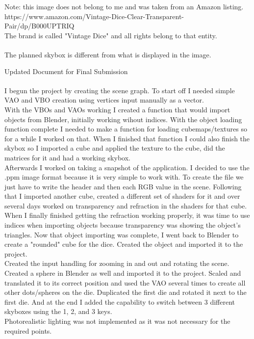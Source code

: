 \documentclass{article}
\begin{document}
Note: this image does not belong to me and was taken from an Amazon listing. \\
https://www.amazon.com/Vintage-Dice-Clear-Transparent-Pair/dp/B000UPTRIQ \\
The brand is called "Vintage Dice" and all rights belong to that entity. \\\\

The planned skybox is different from what is displayed in the image.

\newpage{}
Updated Document for Final Submission\\\\
I begun the project by creating the scene graph. To start off I needed simple VAO
and VBO creation using vertices input manually as a vector. 
\\With the VBOs and VAOs
working I created a function that would import objects from Blender, initially working 
wihout indices. With the object loading function complete I needed to make a function
for loading cubemaps/textures so for a while I worked on that.
When I finished that function I could also finish the skybox so I imported a cube and
applied the texture to the cube, did the matrices for it and had a working skybox.
\\Afterwards I worked on taking a snapshot of the application. I decided to use the
.ppm image format because it is very simple to work with. To create the file we just have
to write the header and then each RGB value in the scene. Following that I imported another cube, created a different set of shaders for it
and over several days worked on transparency and refraction in the shaders for that 
cube.
\\When I finally finished getting the refraction working properly, it was time to
use indices when importing objects because transparency was showing the object's 
triangles. Now that object importing was complete, I went back to Blender to create a "rounded"
cube for the dice. Created the object and imported it to the project.
\\Created the input handling for zooming in and out and rotating the scene. 
Created a sphere in Blender as well and imported it to the project. Scaled and
translated it to its correct position and used the VAO several times to create all
other dots/spheres on the die. Duplicated the first die and rotated it next to the first die. 
And at the end I added the capability to switch between 3 different skyboxes using the
1, 2, and 3 keys.
\\Photorealistic lighting was not implemented as it was not necessary for the required points.
\end{document}
